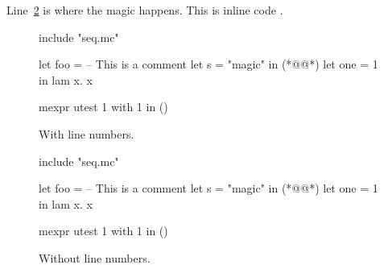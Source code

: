 \documentclass{article}
\begin{document}
Line~\ref{l:magic} is where the magic happens. This is inline code
.

\begin{figure}[h]
  \begin{mcore-lines}
  include "seq.mc"
  
  let foo =
    -- This is a comment
    let s = "magic" in (*@\label{l:magic}@*)
    let one = 1 in
    lam x. x 

  mexpr
    utest 1 with 1 in ()
  \end{mcore-lines}
  \caption{With line numbers.}
\end{figure}

\begin{figure}[h]
  \begin{mcore}
  include "seq.mc"
  
  let foo =
    -- This is a comment
    let s = "magic" in (*@\label{l:magic}@*)
    let one = 1 in
    lam x. x 

  mexpr
    utest 1 with 1 in ()
  \end{mcore}
  \caption{Without line numbers.}
\end{figure}


\end{document}
